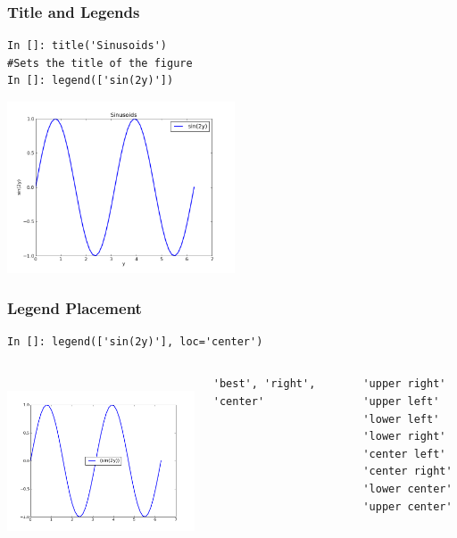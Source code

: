 \documentclass[14pt,compress]{beamer}
\begin{document}
\begin{frame}[fragile]
\frametitle{Title and Legends}
\vspace*{-0.15in}
\begin{lstlisting}
In []: title('Sinusoids')
#Sets the title of the figure
In []: legend(['sin(2y)'])
\end{lstlisting}
  \vspace*{-0.1in}
  \begin{center}
  \includegraphics[height=2in, interpolate=true]{data/legend}  
  \end{center}
\end{frame}

\begin{frame}[fragile]
\frametitle{Legend Placement}

\begin{block}{}
    \small
\begin{lstlisting}
In []: legend(['sin(2y)'], loc='center')
\end{lstlisting}
\end{block}

\begin{columns}
 \includegraphics[height=2in, interpolate=true]{data/position}  
\begin{lstlisting}
'best', 'right', 'center'
\end{lstlisting}
\vspace{-0.2in}
\begin{lstlisting}
'upper right'     
'upper left'      
'lower left'      
'lower right'     
'center left'     
'center right'    
'lower center'    
'upper center'    
\end{lstlisting}
\end{columns}
\end{frame}
\end{document}
